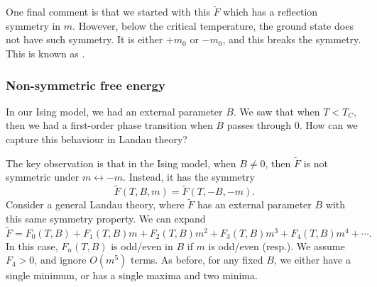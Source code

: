 \documentclass[a4paper]{article}
\begin{document}
One final comment is that we started with this $\tilde{F}$ which has a reflection symmetry in $m$. However, below the critical temperature, the ground state does not have such symmetry. It is either $+m_0$ or $- m_0$, and this breaks the symmetry. This is known as .

\subsubsection*{Non-symmetric free energy}
In our Ising model, we had an external parameter $B$. We saw that when $T < T_C$, then we had a first-order phase transition when $B$ passes through $0$. How can we capture this behaviour in Landau theory?

The key observation is that in the Ising model, when $B \not= 0$, then $\tilde{F}$ is not symmetric under $m \leftrightarrow -m$. Instead, it has the symmetry
\[
  \tilde{F}(T, B, m) = \tilde{F}(T, -B, -m).
\]
Consider a general Landau theory, where $\tilde{F}$ has an external parameter $B$ with this same symmetry property. We can expand
\[
  \tilde{F} = F_0(T, B) + F_1(T, B)m + F_2(T, B) m^2 + F_3(T, B) m^3 + F_4(T, B)m^4 + \cdots.
\]
In this case, $F_n(T, B)$ is odd/even in $B$ if $m$ is odd/even (resp.). We assume $F_4 > 0$, and ignore $O(m^5)$ terms. As before, for any fixed $B$, we either have a single minimum, or has a single maxima and two minima.
\end{document}
